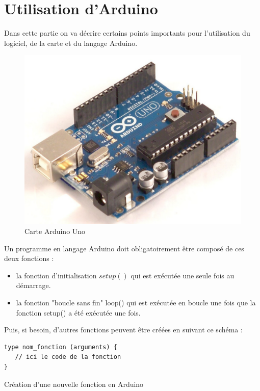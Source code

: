 \section{Utilisation d'Arduino}

  Dans cette partie on va décrire certains points importants pour l'utilisation du logiciel, de la carte et du langage Arduino.

\begin{figure}[h]
\begin{center}
 \includegraphics[scale=0.25]{../images/Arduino/arduinoUno.png}
\caption{Carte Arduino Uno}
\end{center}
\end{figure}
\newpage
Un programme en langage Arduino doit obligatoirement être composé de ces deux fonctions :
\begin{itemize}
 \item la fonction d'initialisation $setup()$ qui est exécutée une seule fois au démarrage.
 \item la fonction "boucle sans fin" loop() qui est exécutée en boucle une fois que la fonction setup() a été exécutée une fois.
\end{itemize}

Puis, si besoin, d'autres fonctions peuvent être créées en suivant ce schéma :
\begin{table}[h]
\begin{lstlisting}
type nom_fonction (arguments) {
   // ici le code de la fonction
}
\end{lstlisting}
\caption{Création d'une nouvelle fonction en Arduino}
\end{table}


